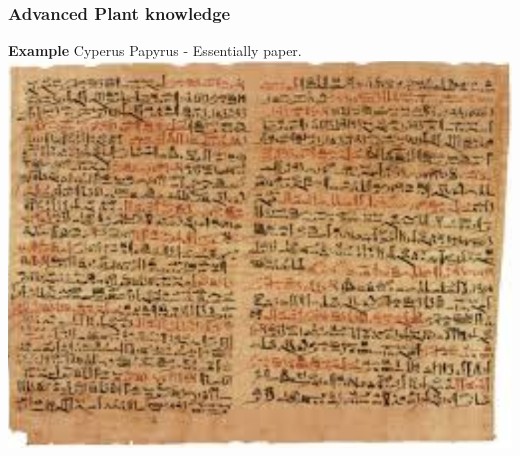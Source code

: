 \documentclass[11pt]{article}
\begin{document}
\subsubsection{Advanced Plant knowledge}
\label{sec-4-5-2}
\textbf{Example} Cyperus Papyrus - Essentially paper.
\includegraphics[width=.9\linewidth]{img/papyrusPg.png}
\end{document}
